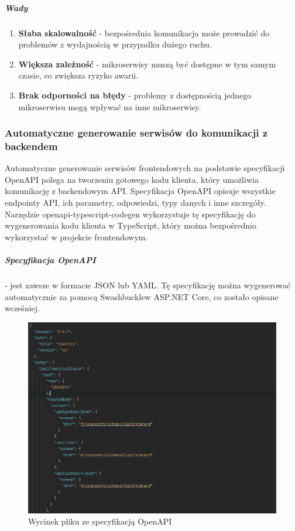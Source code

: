 \clearpage

\subparagraph{Wady}

\begin{enumerate}
\item {\bf Słaba skalowalność} - bezpośrednia komunikacja może prowadzić do problemów z wydajnością w przypadku dużego ruchu.
\item {\bf Większa zależność} - mikroserwisy muszą być dostępne w tym samym czasie, co zwiększa ryzyko awarii.
\item {\bf Brak odporności na błędy} - problemy z dostępnością jednego mikroserwisu mogą wpływać na inne mikroserwisy.

\end{enumerate}

\subsubsection{Automatyczne generowanie serwisów do komunikacji \linebreak z backendem}
Automatyczne generowanie serwisów frontendowych na podstawie specyfikacji OpenAPI polega na tworzeniu gotowego kodu klienta, który umożliwia komunikację z backendowym API. Specyfikacja OpenAPI opisuje wszystkie endpointy API, ich parametry, odpowiedzi, typy danych i inne szczegóły. Narzędzie openapi-typescript-codegen wykorzystuje tę specyfikację do wygenerowania kodu klienta w TypeScript, który można bezpośrednio wykorzystać w projekcie frontendowym.

\subparagraph{Specyfikacja OpenAPI} - jest zawsze w formacie JSON lub YAML. Tę specyfikację można wygenerować automatycznie za pomocą Swashbuckle\linebreak w ASP.NET Core, co zostało opisane wcześniej.

\clearpage

\begin{figure}[H]
    \centering
    \includegraphics[width=1\linewidth]{Obrazy/swaggerExample.png}
    \caption{Wycinek pliku ze specyfikacją OpenAPI}
    \label{fig:enter-label}
\end{figure}

